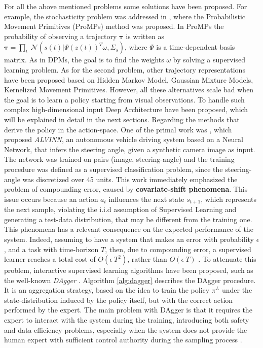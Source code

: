 For all the above mentioned problems some solutions have been proposed. For example, the stochasticity problem was addressed in \cite{paraschos2013ProMPs}, where the Probabilistic Movement Primitives (ProMPs) method was proposed. In ProMPs the probability of observing a trajectory $\boldsymbol{\tau}$ is written as $\boldsymbol{\tau} = \underset{t}{\prod} \ \mathcal{N}(s(t)|\Psi(z(t))^{T}\omega, \Sigma_{s})$, where $\Psi$ is a time-dependent basis matrix. As in DPMs, the goal is to find the weights $\omega$ by solving a supervised learning problem. As for the second problem, other trajectory representations have been proposed based on Hidden Markov Model, Gaussian Mixture Models, Kernelized Movement Primitives. However, all these alternatives scale bad when the goal is to learn a policy starting from visual observations. To handle such complex high-dimensional input Deep Architecture have been proposed, which will be explained in detail in the next sections.
\newline Regarding the methods that derive the policy in the action-space. One of the primal work was \cite{pomerleau1988alvinn}, which proposed \textit{ALVINN}, an autonomous vehicle driving system based on a Neural Network, that infers the steering angle, given a synthetic camera image as input. The network was trained on pairs (image, steering-angle) and the training procedure was defined as a supervised classification problem, since the steering-angle was discretized over 45 units. This work immediately emphasized the problem of compounding-error, caused by \textbf{covariate-shift phenomena}. This issue occurs because an action $a_{t}$ influences the next state $s_{t+1}$, which represents the next sample, violating the i.i.d assumption of Supervised Learning and generating a test-data distribution, that may be different from the training one. This phenomena has a relevant consequence on the expected performance of the system. Indeed, assuming to have a system that makes an error with probability $\epsilon$, and a task with time-horizon $T$, then, due to compounding error, a supervised learner reaches a total cost of $O(\epsilon \ T^{2})$, rather than $O(\epsilon \ T)$ \cite{ross2010efficient_reductions,ross2011dagger}. To attenuate this problem, interactive supervised learning algorithms have been proposed, such as the well-known \textit{DAgger} \cite{ross2011dagger}. Algorithm \ref{alg:dagger} describes the DAgger procedure. It is an aggregation strategy, based on the idea to train the policy $\pi^{L}$ under the state-distribution induced by the policy itself, but with the correct action performed by the expert. The main problem with DAgger is that it requires the expert to interact with the system during the training, introducing both safety and data-efficiency problems, especially when the system does not provide the human expert with sufficient control authority during the sampling process \cite{laskey2017comparing_hc_rc}. 
